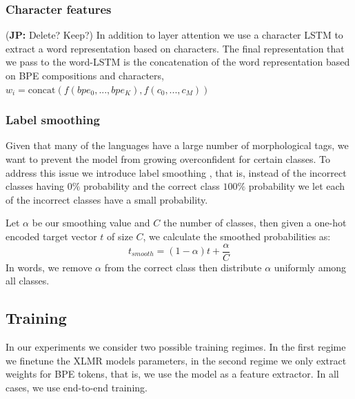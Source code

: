 \documentclass[11pt]{article}
\newcommand\jp[1]{(\textbf{JP:} #1)}
\begin{document}
	\subsubsection{Character features}
        \jp{Delete? Keep?}
    	In addition to layer attention we use a character LSTM to
     extract a word representation based on characters. The final
     representation that we pass to the word-LSTM is the concatenation
     of the word representation based on BPE compositions and
     characters,
     $w_i = \text{concat}(f(bpe_0,...,bpe_K), f(c_0, ..., c_M))$
	
	\subsubsection{Label smoothing}
    	Given that many of the languages have a large number of
     morphological tags, we want to prevent the model from growing
     overconfident for certain classes. To address this issue we
     introduce label smoothing \cite{szegedy2016rethinking}, that is,
     instead of the incorrect classes having $0\%$ probability and the
     correct class $100\%$ probability we let each of the incorrect
     classes have a small probability.


     Let $\alpha$ be our smoothing value and $C$ the number of
     classes, then given a one-hot encoded target vector $t$ of size
     $C$, we calculate the smoothed probabilities as:
    \begin{equation}
        t_{smooth} = (1-\alpha)t + \frac{\alpha}{C}
    \end{equation}
    In words, we remove $\alpha$ from the correct class then
    distribute $\alpha$ uniformly among all classes.

     \subsection{Training}

	
     In our experiments we consider two possible training regimes. In
     the first regime we finetune the XLMR models parameters, in the
     second regime we only extract weights for BPE tokens, that is, we
     use the model as a feature extractor. In all cases, we use
     end-to-end training.
     
\end{document}
